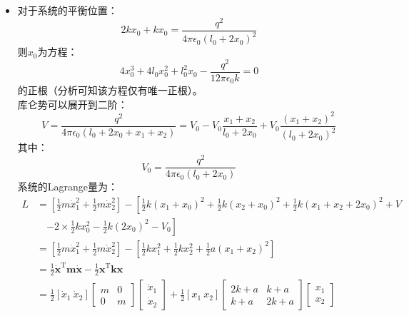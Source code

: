 \documentclass[a4paper,fontset=windows]{ctexart}
\begin{document}
\begin{itemize}
        \item[3.1.(2)]
        对于系统的平衡位置：
        \[
        2kx_0 + kx_0 = \frac{q^2}{4\pi\epsilon_0(l_0+2x_0)^2}
        \]
        则$x_0$为方程：
        \[
        4x_0^3 + 4l_0x_0^2 + l_0^{2}x_0 - \frac{q^2}{12\pi\epsilon_{0}k} = 0
        \]
        的正根（分析可知该方程仅有唯一正根）。 \\
        库仑势可以展开到二阶：
        \[
        V = \frac{q^2}{4\pi\epsilon_0(l_0+2x_0+x_1+x_2)} = V_0 - V_0\frac{x_1+x_2}{l_0+2x_0} + V_0\frac{(x_1+x_2)^2}{(l_0+2x_0)^2}
        \]
        其中：
        \[
        V_0 = \frac{q^2}{4\pi\epsilon_0(l_0+2x_0)}
        \]
        系统的Lagrange量为：
        \begin{align*}
            L
            &=
            \left[\frac{1}{2}m\dot{x}_1^2 + \frac{1}{2}m\dot{x}_2^2\right] - \left[\frac{1}{2}k(x_1+x_0)^2 + \frac{1}{2}k(x_2+x_0)^2 + \frac{1}{2}k(x_1+x_2+2x_0)^2 + V\right. \\
            &\quad \left.- 2\times\frac{1}{2}kx_0^2 - \frac{1}{2}k(2x_0)^2 - V_0\right] \\
            &= \left[\frac{1}{2}m\dot{x}_1^2 + \frac{1}{2}m\dot{x}_2^2\right] - \left[\frac{1}{2}kx_1^2 + \frac{1}{2}kx_2^2 + \frac{1}{2}a(x_1+x_2)^2\right] \\
            &= \frac{1}{2}\boldsymbol{\dot{x}}^{\mathrm{T}}\boldsymbol{m}\boldsymbol{\dot{x}} - \frac{1}{2}\boldsymbol{x}^{\mathrm{T}}\boldsymbol{k}\boldsymbol{x} \\
            &= \frac{1}{2}
            [\dot{x}_1\ \dot{x}_2]
            \begin{bmatrix}
                m & 0 \\
                0 & m
            \end{bmatrix}
            \begin{bmatrix}
                \dot{x}_1 \\
                \dot{x}_2
            \end{bmatrix}
            + \frac{1}{2}
            [x_1\ x_2]
            \begin{bmatrix}
                2k+a & k+a \\
                k+a & 2k+a
            \end{bmatrix}
            \begin{bmatrix}
                x_1 \\
                x_2
            \end{bmatrix}
        \end{align*}

\end{itemize}
\end{document}
